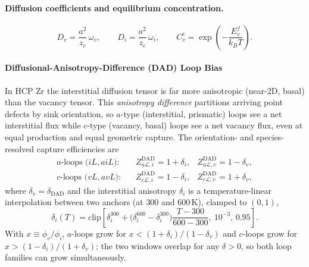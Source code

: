\documentclass{article}
\begin{document}
\paragraph{Diffusion coefficients and equilibrium concentration.}
\begin{equation}
D_v=\frac{a^2}{z_c}\,\omega_v,\qquad
D_i=\frac{a^2}{z_c}\,\omega_i,\qquad
C_v^e=\exp\!\left(-\frac{E_v^f}{k_BT}\right).
\end{equation}

\paragraph{Diffusional-Anisotropy-Difference (DAD) Loop Bias}
In HCP Zr the interstitial diffusion tensor is far more anisotropic
(near-2D, basal) than the vacancy tensor. This \emph{anisotropy difference}
partitions arriving point defects by sink orientation, so $a$-type
(interstitial, prismatic) loops see a net interstitial flux while $c$-type
(vacancy, basal) loops see a net vacancy flux, even at equal production and
equal geometric capture. The orientation- and species-resolved capture
efficiencies are
\begin{align}
\text{$a$-loops ($iL,aiL$):}\quad & Z^{\mathrm{DAD}}_{a\mathcal L,i}=1+\delta_i, & Z^{\mathrm{DAD}}_{a\mathcal L,v}=1-\delta_v,\\
\text{$c$-loops ($vL,avL$):}\quad & Z^{\mathrm{DAD}}_{c\mathcal L,i}=1-\delta_i, & Z^{\mathrm{DAD}}_{c\mathcal L,v}=1+\delta_v,
\label{eq:DAD}
\end{align}
where $\delta_v=\delta_{\mathrm{DAD}}$ and the interstitial anisotropy
$\delta_i$ is a temperature-linear interpolation between two anchors
(at $300$ and $600\,$K), clamped to $(0,1)$,
\begin{equation}
\delta_i(T)=\mathrm{clip}\!\left[\delta_i^{300}
  +\bigl(\delta_i^{600}-\delta_i^{300}\bigr)\frac{T-300}{600-300},\ 10^{-3},\,0.95\right].
\end{equation}
With $x\equiv \phi_v/\phi_i$, $a$-loops grow for
$x<(1+\delta_i)/(1-\delta_v)$ and $c$-loops grow for
$x>(1-\delta_i)/(1+\delta_v)$; the two windows overlap for any $\delta>0$, so
both loop families can grow simultaneously.
\end{document}
